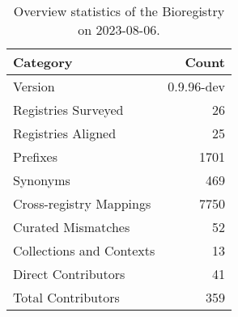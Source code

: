 \begin{table}
\caption{Overview statistics of the Bioregistry on 2023-08-06.}
\label{tab:bioregistry-summary}
\begin{tabular}{lr}
\toprule
Category & Count \\
\midrule
Version & 0.9.96-dev \\
Registries Surveyed & 26 \\
Registries Aligned & 25 \\
Prefixes & 1701 \\
Synonyms & 469 \\
Cross-registry Mappings & 7750 \\
Curated Mismatches & 52 \\
Collections and Contexts & 13 \\
Direct Contributors & 41 \\
Total Contributors & 359 \\
\bottomrule
\end{tabular}
\end{table}
